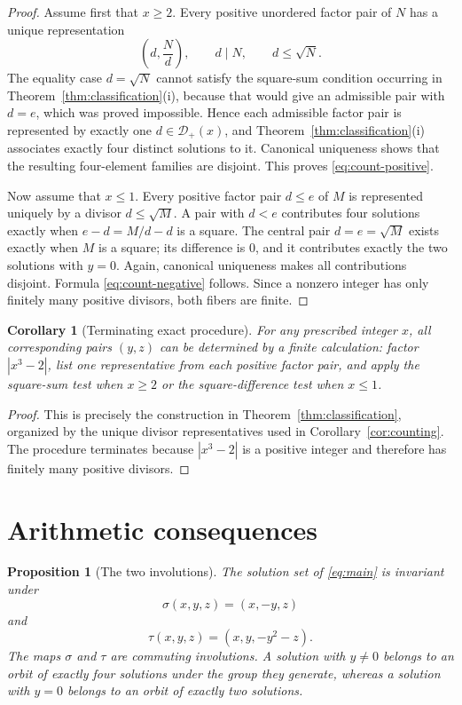 \documentclass[11pt,a4paper]{amsart}
\newtheorem{proposition}[theorem]{Proposition}
\newtheorem{corollary}[theorem]{Corollary}
\theoremstyle{remark}
\begin{document}
\begin{proof}
Assume first that $x\geq 2$.  Every positive unordered factor pair of $N$ has a unique representation
\[
 \left(d,\frac Nd\right),
 \qquad d\mid N,
 \qquad d\leq\sqrt N.
\]
The equality case $d=\sqrt N$ cannot satisfy the square-sum condition occurring in Theorem~\ref{thm:classification}(i), because that would give an admissible pair with $d=e$, which was proved impossible.  Hence each admissible factor pair is represented by exactly one $d\in\mathcal D_+(x)$, and Theorem~\ref{thm:classification}(i) associates exactly four distinct solutions to it.  Canonical uniqueness shows that the resulting four-element families are disjoint.  This proves \eqref{eq:count-positive}.

Now assume that $x\leq 1$.  Every positive factor pair $d\leq e$ of $M$ is represented uniquely by a divisor $d\leq\sqrt M$.  A pair with $d<e$ contributes four solutions exactly when $e-d=M/d-d$ is a square.  The central pair $d=e=\sqrt M$ exists exactly when $M$ is a square; its difference is $0$, and it contributes exactly the two solutions with $y=0$.  Again, canonical uniqueness makes all contributions disjoint.  Formula \eqref{eq:count-negative} follows.  Since a nonzero integer has only finitely many positive divisors, both fibers are finite.
\end{proof}

\begin{corollary}[Terminating exact procedure]\label{cor:algorithm}
For any prescribed integer $x$, all corresponding pairs $(y,z)$ can be determined by a finite calculation: factor $|x^3-2|$, list one representative from each positive factor pair, and apply the square-sum test when $x\geq2$ or the square-difference test when $x\leq1$.
\end{corollary}

\begin{proof}
This is precisely the construction in Theorem~\ref{thm:classification}, organized by the unique divisor representatives used in Corollary~\ref{cor:counting}.  The procedure terminates because $|x^3-2|$ is a positive integer and therefore has finitely many positive divisors.
\end{proof}

\section{Arithmetic consequences}

\begin{proposition}[The two involutions]\label{prop:symmetry}
The solution set of \eqref{eq:main} is invariant under
\[
 \sigma(x,y,z)=(x,-y,z)
\]
and
\[
 \tau(x,y,z)=(x,y,-y^2-z).
\]
The maps $\sigma$ and $\tau$ are commuting involutions.  A solution with $y\neq0$ belongs to an orbit of exactly four solutions under the group they generate, whereas a solution with $y=0$ belongs to an orbit of exactly two solutions.
\end{proposition}
\end{document}
